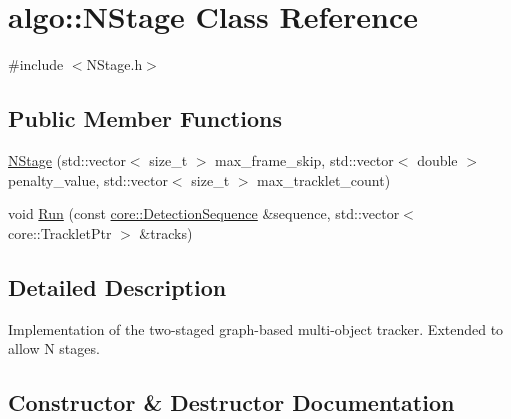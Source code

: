 \hypertarget{classalgo_1_1NStage}{}\section{algo\+:\+:N\+Stage Class Reference}
\label{classalgo_1_1NStage}


{\ttfamily \#include $<$N\+Stage.\+h$>$}

\subsection*{Public Member Functions}
\begin{DoxyCompactItemize}
\item 
\hyperlink{classalgo_1_1NStage_a9706139a9ccfab10ab6458e06e42d7a5}{N\+Stage} (std\+::vector$<$ size\+\_\+t $>$ max\+\_\+frame\+\_\+skip, std\+::vector$<$ double $>$ penalty\+\_\+value, std\+::vector$<$ size\+\_\+t $>$ max\+\_\+tracklet\+\_\+count)
\item 
void \hyperlink{classalgo_1_1NStage_a4e4e881b9c6f65d9e86449c71ab6d778}{Run} (const \hyperlink{classcore_1_1DetectionSequence}{core\+::\+Detection\+Sequence} \&sequence, std\+::vector$<$ core\+::\+Tracklet\+Ptr $>$ \&tracks)
\end{DoxyCompactItemize}


\subsection{Detailed Description}
Implementation of the two-\/staged graph-\/based multi-\/object tracker. Extended to allow N stages. 

\subsection{Constructor \& Destructor Documentation}
